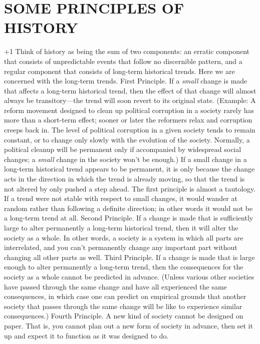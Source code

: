 \chapter{SOME PRINCIPLES OF HISTORY}

{\looseness+1
 Think of history as being the sum of two components: an erratic component that consists of unpredictable events that follow no discernible pattern, and a regular component that consists of long-term historical trends. Here we are concerned with the long-term trends.
 {\sc First Principle.} If a {\em small} change is made that affects a long-term historical trend, then the effect of that change will almost always be transitory—the trend will soon revert to its original state. (Example: A reform movement designed to clean up political corruption in a society rarely has more than a short-term effect; sooner or later the reformers relax and corruption creeps back in. The level of political corruption in a given society tends to remain constant, or to change only slowly with the evolution of the society. Normally, a political cleanup will be permanent only if accompanied by widespread social changes; a {\em small} change in the society won’t be enough.) If a small change in a long-term historical trend appears to be permanent, it is only because the change acts in the direction in which the trend is already moving, so that the trend is not altered by only pushed a step ahead.
 The first principle is almost a tautology. If a trend were not stable with respect to small changes, it would wander at random rather than following a definite direction; in other words it would not be a long-term trend at all.
 {\sc Second Principle.} If a change is made that is sufficiently large to alter permanently a long-term historical trend, then it will alter the society as a whole. In other words, a society is a system in which all parts are interrelated, and you can’t permanently change any important part without changing all other parts as well.
 {\sc Third Principle.} If a change is made that is large enough to alter permanently a long-term trend, then the consequences for the society as a whole cannot be predicted in advance. (Unless various other societies have passed through the same change and have all experienced the same consequences, in which case one can predict on empirical grounds that another society that passes through the same change will be like to experience similar consequences.)
 {\sc Fourth Principle.} A new kind of society cannot be designed on paper. That is, you cannot plan out a new form of society in advance, then set it up and expect it to function as it was designed to do.
}

